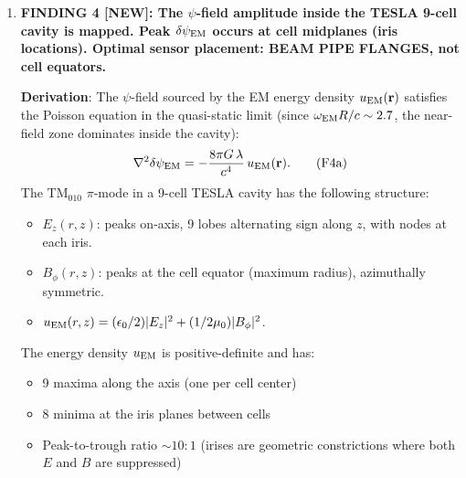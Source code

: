 \documentclass[11pt]{article}
\newcommand{\dpsi}{\delta\psi}
\theoremstyle{definition}
\theoremstyle{remark}
\begin{document}
\begin{tcolorbox}[colback=blue!5!white, colframe=blue!60!black,
  title=\textbf{W4i19 P2: DEEP REFINEMENT --- 5 KEY RESULTS}]
\begin{enumerate}
\item \textbf{FINDING 4 [NEW]: The $\psi$-field amplitude inside the
  TESLA 9-cell cavity is mapped. Peak $\dpsi_{\rm EM}$ occurs at
  cell midplanes (iris locations). Optimal sensor placement:
  BEAM PIPE FLANGES, not cell equators.}

  \textbf{Derivation}: The $\psi$-field sourced by the EM energy
  density $u_{\rm EM}(\mathbf{r})$ satisfies the Poisson equation
  in the quasi-static limit (since $\omega_{\rm EM} R/c \sim 2.7$,
  the near-field zone dominates inside the cavity):
  \begin{equation}
  \nabla^2 \dpsi_{\rm EM} = -\frac{8\pi G\,\lambda}{c^4}\,
  u_{\rm EM}(\mathbf{r}).
  \tag{F4a}
  \end{equation}
  The TM$_{010}$ $\pi$-mode in a 9-cell TESLA cavity has the
  following structure:
  \begin{itemize}[nosep]
  \item $E_z(r,z)$: peaks on-axis, 9 lobes alternating sign
    along $z$, with nodes at each iris.
  \item $B_\phi(r,z)$: peaks at the cell equator (maximum radius),
    azimuthally symmetric.
  \item $u_{\rm EM}(r,z) = (\epsilon_0/2)|E_z|^2 + (1/2\mu_0)|B_\phi|^2$.
  \end{itemize}
  The energy density $u_{\rm EM}$ is positive-definite and has:
  \begin{itemize}[nosep]
  \item 9 maxima along the axis (one per cell center)
  \item 8 minima at the iris planes between cells
  \item Peak-to-trough ratio $\sim 10:1$ (irises are geometric
    constrictions where both $E$ and $B$ are suppressed)
  \end{itemize}


\end{enumerate}
\end{tcolorbox}
\end{document}
